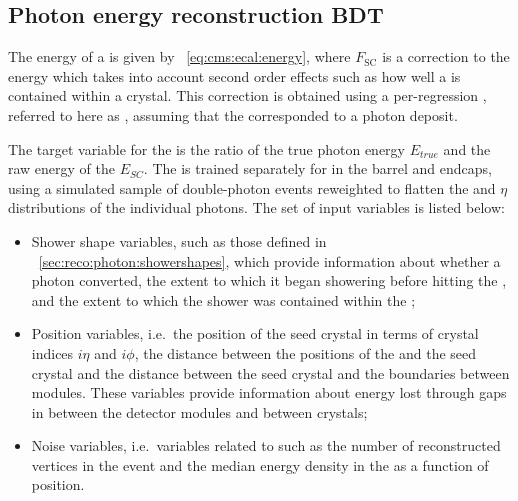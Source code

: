 \subsection{Photon energy reconstruction BDT}
\label{sec:reco:photon:phoenergybdt}

The energy of a \SC is given by \Eq~\ref{eq:cms:ecal:energy}, %
where $F_{\text{SC}}$ is a correction to the \SC energy which takes into account second order effects such as how well a \SC is contained within a crystal. This correction is obtained using a per-\SC regression \BDT, referred to here as \PhoEnergyBdt, assuming that the \SC corresponded to a photon deposit. %

The target variable for the \PhoEnergyBdt is the ratio of the true photon energy $E_{true}$ and the raw energy of the \SC $E_{SC}$. The \PhoEnergyBdt is trained separately for \SC\s in the barrel and endcaps, using a simulated sample of double-photon events reweighted to flatten the \pT and $\eta$ distributions of the individual photons. The set of input variables is listed below:
\begin{itemize}
\item Shower shape variables, such as those defined in \Sec~\ref{sec:reco:photon:showershapes}, which provide information about whether a photon converted, the extent to which it began showering before hitting the \ECAL, and the extent to which the shower was contained within the \ECAL;
\item Position variables, i.e.~the position of the seed crystal in terms of crystal indices $i\eta$ and $i\phi$, the distance between the positions of the \SC and the seed crystal and the distance between the seed crystal and the boundaries between \ECAL modules. These variables provide information about energy lost through gaps in between the detector modules and between crystals; 
\item Noise variables, i.e.~variables related to \PU such as the number of reconstructed vertices in the event and the median energy density in the \ECAL as a function of position.
\end{itemize}

